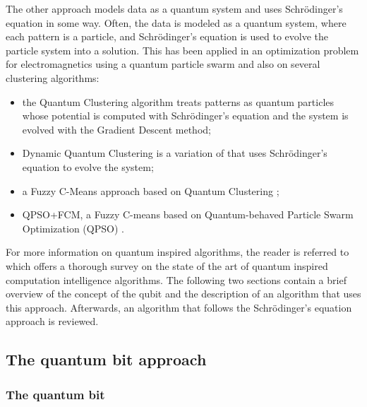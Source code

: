 The other approach models data as a quantum system and uses Schrödinger's equation in some way.
Often, the data is modeled as a quantum system, where each pattern is a particle, and Schrödinger's equation is used to evolve the particle system into a solution.
This has been applied in an optimization problem for electromagnetics using a quantum particle swarm \cite{mikki2006quantum} and also on several clustering algorithms:
\begin{itemize}
	\item the Quantum Clustering \cite{Horn2001b} algorithm treats patterns as quantum particles whose potential is computed with Schrödinger's equation and the system is evolved with the Gradient Descent method;

	\item Dynamic Quantum Clustering \cite{Weinstein2009} is a variation of \citet{Horn2001b} that uses Schrödinger's equation to evolve the system;

	\item a Fuzzy C-Means approach \cite{li2007quantum} based on Quantum Clustering \cite{Horn2001b};

	\item QPSO+FCM, a Fuzzy C-means \cite{Wang2007} based on Quantum-behaved Particle Swarm Optimization (QPSO) \cite{Sun2004}.

\end{itemize}

For more information on quantum inspired algorithms, the reader is referred to \citet{Manju2014} which offers a thorough survey on the state of the art of quantum inspired computation intelligence algorithms.
The following two sections contain a brief overview of the concept of the qubit and the description of an algorithm that uses this approach.
Afterwards, an algorithm that follows the Schrödinger's equation approach is reviewed.

\subsection{The quantum bit approach}
\label{sec:qubit}

\subsubsection{The quantum bit}

